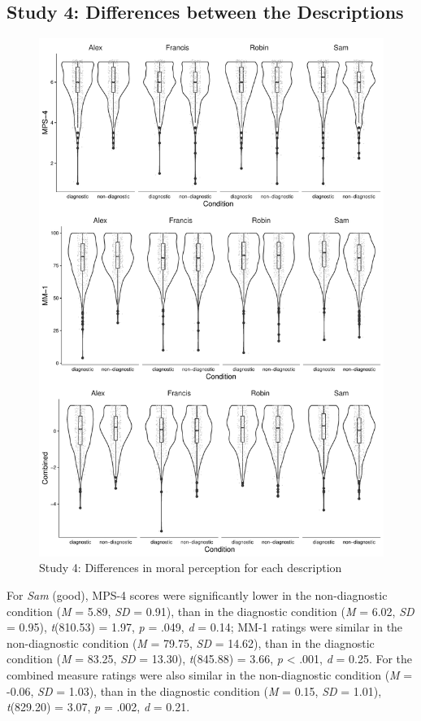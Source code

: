 \documentclass[
  american,
  man,mask,floatsintext]{apa6}
\begin{document}
\newpage

\hypertarget{study-4-differences-between-the-descriptions}{%
\subsection{Study 4: Differences between the Descriptions}\label{study-4-differences-between-the-descriptions}}

\newpage

\begin{figure}[!p]
\includegraphics{Supplementary_files/figure-latex/S4allscenariosPlot-1} \caption{Study 4: Differences in moral perception for each description}\label{fig:S4allscenariosPlot}
\end{figure}

For \emph{Sam} (good), MPS-4 scores were significantly lower in the non-diagnostic condition (\emph{M} = 5.89, \emph{SD} = 0.91), than in the diagnostic condition (\emph{M} = 6.02, \emph{SD} = 0.95), \emph{t}(810.53) = 1.97, \emph{p} = .049, \emph{d} = 0.14; MM-1 ratings were similar in the non-diagnostic condition (\emph{M} = 79.75, \emph{SD} = 14.62), than in the diagnostic condition (\emph{M} = 83.25, \emph{SD} = 13.30), \emph{t}(845.88) = 3.66, \emph{p} \textless{} .001, \emph{d} = 0.25. For the combined measure ratings were also similar in the non-diagnostic condition (\emph{M} = -0.06, \emph{SD} = 1.03), than in the diagnostic condition (\emph{M} = 0.15, \emph{SD} = 1.01), \emph{t}(829.20) = 3.07, \emph{p} = .002, \emph{d} = 0.21.
\end{document}
